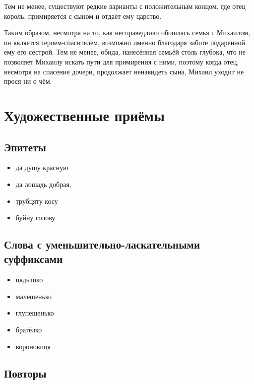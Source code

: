 \documentclass[12pt]{article}
\begin{document}
Тем не менее, существуют редкие варианты с положительным концом, где отец король, примиряется с сыном и отдаёт ему царство.

Таким образом, несмотря на то, как несправедливо обошлась семья с Михаилом, он является героем-спасителем, возможно именно благодаря заботе подаренной ему его сестрой. Тем не менее, обида, нанесённая семьёй столь глубока, что не позволяет Михаилу искать пути для примирения с ними, поэтому когда отец, несмотря на спасение дочери, продолжает ненавидеть сына, Михаил уходит не прося ни о чём.


\section{Художественные приёмы}

\subsection{Эпитеты}

\begin{itemize}

\item {} да душу красную

\item {} да лошадь добрая,

\item трубцяту косу

\item буйну голову

\end{itemize}

\subsection{Слова с уменьшительно-ласкательными суффиксами}

\begin{itemize}

\item цядышко
\item малешенько
\item глупешенько
\item братёлко
\item вороновиця

\end{itemize}

\subsection{Повторы}
\end{document}
